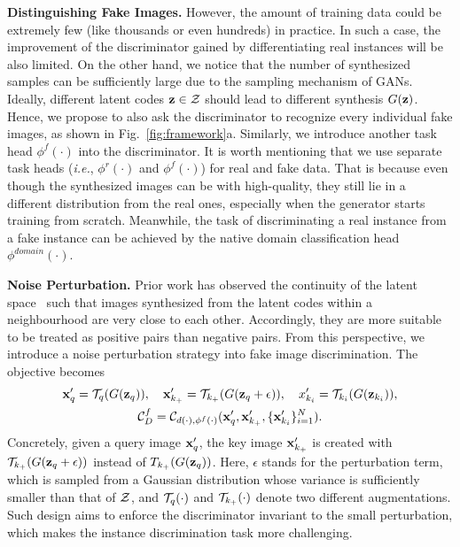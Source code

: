 \documentclass{article}
\begin{document}
\textbf{Distinguishing Fake Images.}
However, the amount of training data could be extremely few (like thousands or even hundreds) in practice.
In such a case, the improvement of the discriminator gained by differentiating real instances will be also limited.
On the other hand, we notice that the number of synthesized samples can be sufficiently large due to the sampling mechanism of GANs.
Ideally, different latent codes ${\rm\bf z}\in\mathcal{Z}$ should lead to different synthesis $G({\rm\bf z})$.
Hence, we propose to also ask the discriminator to recognize every individual fake images, as shown in Fig.~\ref{fig:framework}a.
Similarly, we introduce another task head $\phi^f(\cdot)$ into the discriminator.
It is worth mentioning that we use separate task heads (\textit{i.e.}, $\phi^r(\cdot)$ and $\phi^f(\cdot)$) for real and fake data.
That is because even though the synthesized images can be with high-quality, they still lie in a different distribution from the real ones, especially when the generator starts training from scratch.
Meanwhile, the task of discriminating a real instance from a fake instance can be achieved by the native domain classification head $\phi^{domain}(\cdot)$.


\textbf{Noise Perturbation.}
Prior work has observed the continuity of the latent space~\cite{radford2015unsupervised} such that images synthesized from the latent codes within a neighbourhood are very close to each other.
Accordingly, they are more suitable to be treated as positive pairs than negative pairs.
From this perspective, we introduce a noise perturbation strategy into fake image discrimination.
The objective becomes
\begin{gather}
    {\rm\bf x}'_q = {\mathcal{T}}_q(G({\rm\bf z}_q)), \quad {\rm\bf x}'_{k_+} = {\mathcal{T}}_{k_+}(G({\rm\bf z}_q+\epsilon)), \quad x'_{k_i} = {\mathcal{T}}_{k_i}(G({\rm\bf z}_{k_i})), \\
    {\mathcal{C}}^f_D = {\mathcal{C}}_{d(\cdot), \phi^f(\cdot)}({\rm\bf x}'_q, {\rm\bf x}'_{k_+}, \{{\rm\bf x}'_{k_i}\}_{i=1}^{N}). \label{eqa:fake_cl}
\end{gather}
Concretely, given a query image ${\rm\bf x}'_q$, the key image ${\rm\bf x}'_{k_+}$ is created with ${\mathcal{T}}_{k_+}(G({\rm\bf z}_q+\epsilon))$ instead of $\\T_{k_+}(G({\rm\bf z}_q))$.
Here, $\epsilon$ stands for the perturbation term, which is sampled from a Gaussian distribution whose variance is sufficiently smaller than that of $\mathcal{Z}$,
and ${\mathcal{T}}_q(\cdot)$ and ${\mathcal{T}}_{k_+}(\cdot)$ denote two different augmentations.
Such design aims to enforce the discriminator invariant to the small perturbation, which makes the instance discrimination task more challenging.
\end{document}
